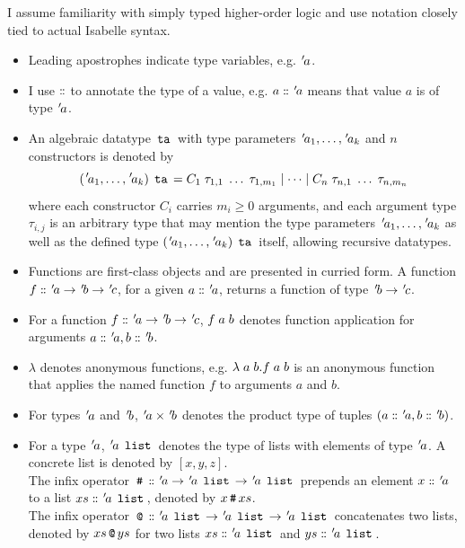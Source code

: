 I assume familiarity with simply typed higher-order logic and use notation closely tied to actual Isabelle syntax.
\begin{itemize}
	\item Leading apostrophes indicate type variables, e.g. $\tv{a}$.
	\item I use $\dbcolon$ to annotate the type of a value, e.g. $a \dbcolon \tv{a}$ means that value $a$ is of type $\tv{a}$.
	\item An algebraic datatype $\iexp{ta}$ with type parameters
	      $\tv{a_1}, \dots, \tv{a_k}$ and $n$ constructors is denoted by
	      $$
		      (\tv{a_1}, \dots, \tv{a_k}) \app \iexp{ta}
		      = C_1 \app \tau_{1,1} \app \dots \app \tau_{1,m_1}
		      \mid \dots \mid
		      C_n \app \tau_{n,1} \app \dots \app \tau_{n,m_n}
	      $$
	      where each constructor $C_i$ carries $m_i \ge 0$ arguments, and each
	      argument type $\tau_{i,j}$ is an arbitrary type that may mention the
	      type parameters $\tv{a_1}, \dots, \tv{a_k}$ as well as the defined type
	      $(\tv{a_1}, \dots, \tv{a_k}) \app \iexp{ta}$ itself, allowing recursive
	      datatypes.
	\item Functions are first-class objects and are presented in curried form.
	      A function $f \dbcolon \tv{a} \rightarrow \tv{b} \rightarrow \tv{c}$, for a given $a \dbcolon \tv{a}$, returns a function of type $\tv{b} \rightarrow \tv{c}$.
	\item For a function $f \dbcolon \tv{a} \rightarrow \tv{b} \rightarrow \tv{c}$, $f\app a\app b$ denotes function application for arguments $a \dbcolon \tv{a}, b \dbcolon \tv{b}$.
	\item $\lambda$ denotes anonymous functions, e.g. $\lambda \app a \app b. f \app a \app b$ is an anonymous function that applies the named function $f$ to arguments $a$ and $b$.
	\item For types $\tv{a}$ and $\tv{b}$, $\tv{a} \times \tv{b}$ denotes the product type of tuples $(a \dbcolon \tv{a}, b \dbcolon \tv{b})$.
	\item For a type $\tv{a}$, $\tv{a} \app \iexp{list}$ denotes the type of lists with elements of type $\tv{a}$.
	      A concrete list is denoted by $[x,y,z]$.\\
	      The infix operator $\iexp{\#} \dbcolon \tv{a} \rightarrow \tv{a} \app \iexp{list} \rightarrow \tv{a} \app \iexp{list}$ prepends an element $x \dbcolon \tv{a}$ to a list $xs \dbcolon \tv{a} \app \iexp{list}$, denoted by $x \iexp{\#} xs$.\\
	      The infix operator $\iexp{@} \dbcolon \tv{a} \app \iexp{list} \rightarrow \tv{a} \app \iexp{list} \rightarrow \tv{a} \app \iexp{list}$ concatenates two lists, denoted by $xs \iexp{@} ys$ for two lists $xs \dbcolon \tv{a} \app \iexp{list}$ and $ys \dbcolon \tv{a} \app \iexp{list}$.\\

\end{itemize}
